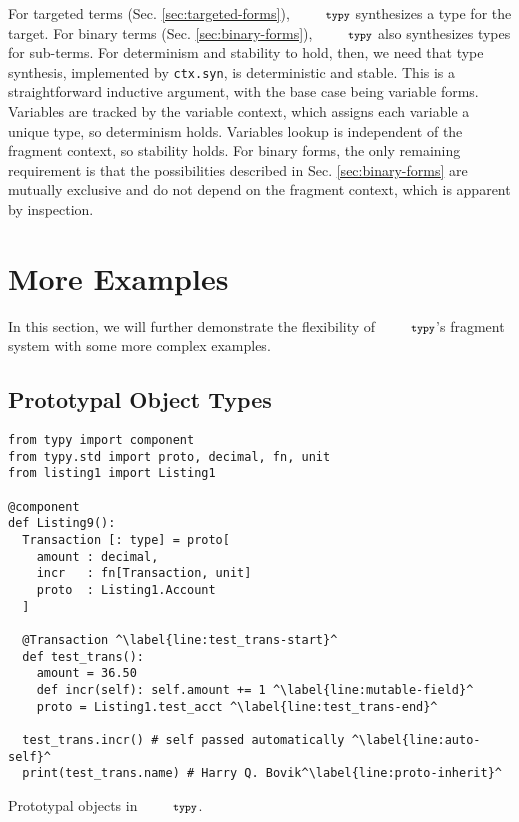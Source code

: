 \documentclass[10pt]{sigplanconf}
\newcommand{\typy}{\texttt{\footnotesize typy}}
\newcommand{\lip}[1]{\lstinline[language=Python,basicstyle=\ttfamily\footnotesize,morekeywords={with},deletendkeywords={tuple,buffer,map}]{#1}}
\newcommand{\li}[1]{\lip{#1}}
\begin{document}
For targeted terms (Sec. \ref{sec:targeted-forms}), $\typy$ synthesizes a type for the target. For binary terms (Sec. \ref{sec:binary-forms}), $\typy$ also synthesizes types for sub-terms. For determinism and stability to hold, then, we need that type synthesis, implemented by \li{ctx.syn}, is deterministic and stable. This is a straightforward inductive argument, with the base case being variable forms. Variables are tracked by the variable context, which assigns each variable a unique type, so determinism holds. Variables lookup is independent of the fragment context, so stability holds. For binary forms, the only remaining requirement is that the possibilities described in Sec. \ref{sec:binary-forms} are mutually exclusive and do not depend on the fragment context, which is apparent by inspection.



\section{More Examples}\label{sec:more-examples}
In this section, we will further demonstrate the flexibility of $\typy$'s fragment system with some more complex examples.

\subsection{Prototypal Object Types}
\begin{codelisting}[t]
\vspace{-3px}
\begin{lstlisting}
from typy import component
from typy.std import proto, decimal, fn, unit
from listing1 import Listing1

@component 
def Listing9():
  Transaction [: type] = proto[
    amount : decimal,
    incr   : fn[Transaction, unit]
    proto  : Listing1.Account
  ]

  @Transaction ^\label{line:test_trans-start}^
  def test_trans():
    amount = 36.50
    def incr(self): self.amount += 1 ^\label{line:mutable-field}^
    proto = Listing1.test_acct ^\label{line:test_trans-end}^

  test_trans.incr() # self passed automatically ^\label{line:auto-self}^
  print(test_trans.name) # Harry Q. Bovik^\label{line:proto-inherit}^
\end{lstlisting}
\caption{Prototypal objects in $\typy$.}
\label{fig:proto-example}
\end{codelisting}
\end{document}
